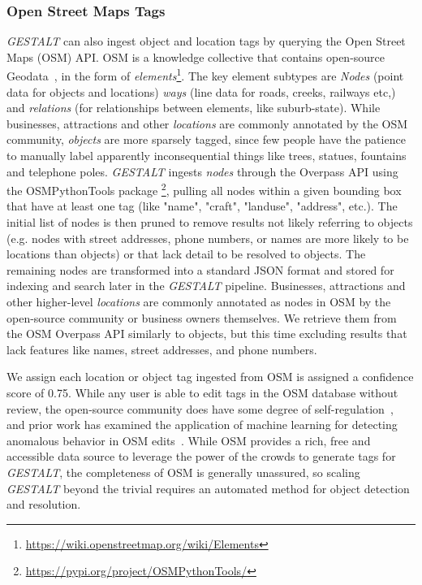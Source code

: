 \subsubsection{Open Street Maps Tags}
\emph{GESTALT} can also ingest object and location tags by querying the Open Street Maps (OSM) API.
OSM is a knowledge collective that contains open-source Geodata~\cite{Haklay2008}, in the form of  \textit{elements}\footnote{\href{https://wiki.openstreetmap.org/wiki/Elements}{https://wiki.openstreetmap.org/wiki/Elements}}. 
The key element subtypes are \textit{Nodes} (point data for objects and locations) \textit{ways} (line data for roads, creeks, railways etc,) and \textit{relations} (for relationships between elements, like suburb-state).
While businesses, attractions and other \textit{locations} are commonly annotated by the OSM community, \textit{objects} are more sparsely tagged, since few people have the patience to manually label apparently inconsequential things like trees, statues, fountains and telephone poles. 
\emph{GESTALT} ingests \textit{nodes} through the Overpass API using the OSMPythonTools package \footnote{\href{https://pypi.org/project/OSMPythonTools/}{https://pypi.org/project/OSMPythonTools/}}, pulling all nodes within a given bounding box that have at least one tag (like "name", "craft", "landuse", "address", etc.).
The initial list of nodes is then pruned to remove results not likely referring to objects (e.g. nodes with street addresses, phone numbers, or names are more likely to be locations than objects) or that lack detail to be resolved to objects.
The remaining nodes are transformed into a standard JSON format and stored for indexing and search later in the \emph{GESTALT} pipeline. 
Businesses, attractions and other higher-level \textit{locations} are commonly annotated as nodes in OSM by the open-source community or business owners themselves. 
We retrieve them from the OSM Overpass API similarly to objects, but this time excluding results that lack features like names, street addresses, and phone numbers. 

We assign each location or object tag ingested from OSM is assigned a confidence score of 0.75.
While any user is able to edit tags in the OSM database without review, the open-source community does have some degree of self-regulation~\cite{VargasMunoz2020}, and prior work has examined the application of machine learning for detecting anomalous behavior in OSM edits~\cite{Mooney2017}.
While OSM provides a rich, free and accessible data source to leverage the power of the crowds to generate tags for \emph{GESTALT}, the completeness of OSM is generally unassured, so scaling \textit{GESTALT} beyond the trivial requires an automated method for object detection and resolution. 

